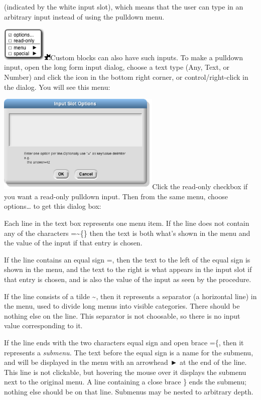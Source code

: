 (indicated by the white input slot), which means that the user can type
in an arbitrary input instead of using the pulldown menu.

\includegraphics[width=0.83264in,height=0.65278in]{media/image663.png}\includegraphics[width=0.13194in,height=0.13194in]{media/image658.png}Custom
blocks can also have such inputs. To make a pulldown input, open the
long form input dialog, choose a text type (Any, Text, or Number) and
click the icon in the bottom right corner, or control/right-click in the
dialog. You will see this menu:

\includegraphics[width=3.07639in,height=1.875in]{media/image664.png}Click
the read-only checkbox if you want a read-only pulldown input. Then from
the same menu, choose options\ldots{} to get this dialog box:

Each line in the text box represents one menu item. If the line does not
contain any of the characters =\textasciitilde\{\} then the text is both
what's shown in the menu and the value of the input if that entry is
chosen.

If the line contains an equal sign =, then the text to the left of the
equal sign is shown in the menu, and the text to the right is what
appears in the input slot if that entry is chosen, and is also the value
of the input as seen by the procedure.

If the line consists of a tilde \textasciitilde, then it represents a
separator (a horizontal line) in the menu, used to divide long menus
into visible categories. There should be nothing else on the line. This
separator is not choosable, so there is no input value corresponding to
it.

If the line ends with the two characters equal sign and open brace =\{,
then it represents a \emph{submenu.} The text before the equal sign is a
name for the submenu, and will be displayed in the menu with an
arrowhead ► at the end of the line. This line is not clickable, but
hovering the mouse over it displays the submenu next to the original
menu. A line containing a close brace \} ends the submenu; nothing else
should be on that line. Submenus may be nested to arbitrary depth.

